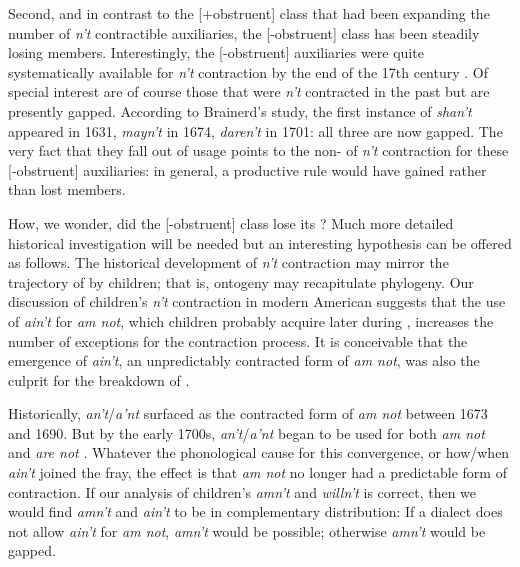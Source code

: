\documentclass[output=paper,
modfonts
]{LSP/langsci}
\begin{document}
Second, and  in contrast to the [+obstruent] class that
had been expanding the number of \textit{n't} contractible auxiliaries,
the [-obstruent] class has been 
steadily losing members.  
Interestingly, the [-obstruent] auxiliaries were quite systematically
available for \textit{n't} contraction by the end of the 17th century
\citep{Brainerd1989}.   
Of special interest are of course those that were \textit{n't} contracted
in the past but are presently gapped. According to Brainerd's study, 
the first
instance of \textit{shan't} appeared in 1631, \textit{mayn't} in  1674, \textit{daren't} in 1701: all three are now gapped. 
 The very fact that they fall out of usage
points to the non- of  \textit{  n't} contraction for these
[-obstruent] auxiliaries: 
in general, a productive rule would have gained rather than lost
members. 

How, we wonder, did the [-obstruent] class lose its ? Much
more detailed historical investigation will be needed but an
interesting  hypothesis can be offered as follows. The historical
development of \textit{n't} contraction may mirror the trajectory of
 by children; that is, ontogeny may recapitulate
phylogeny. Our discussion of children's \textit{n't} contraction in
modern American  suggests that the use of \textit{ain't} for \textit{am not}, which children probably acquire later during ,
increases the number of exceptions for the contraction 
process. It is conceivable that the emergence  of
\textit{ain't}, an unpredictably  contracted form of \textit{am not},  
was also the culprit for the breakdown of . 

Historically,  \textit{an't}/\textit{a'nt} surfaced as the contracted form
of \textit{am not} between 1673
and 1690. But by the early 1700s, \textit{an't}/\textit{a'nt} began to be
used for both \textit{am not} and \textit{are not}
\citep[186]{Brainerd1989}. Whatever the phonological cause for this convergence,
or how/when \textit{ain't} joined the fray, the effect is that \textit{am not} no
longer had a predictable form of contraction. If our analysis of
children's \textit{amn't} and \textit{willn't} is correct, then we would
find \textit{amn't} and \textit{ain't} to be in complementary distribution: 
If a dialect does not allow \textit{ain't} for \textit{am not}, \textit{amn't}
would be possible; otherwise \textit{amn't} would be gapped. 
\end{document}
